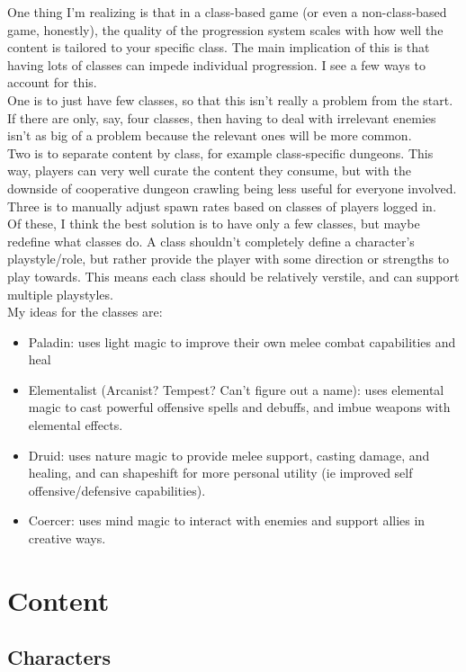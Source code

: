 \documentclass{article}
\begin{document}
One thing I'm realizing is that in a class-based game (or even a non-class-based game, honestly), the
quality of the progression system scales with how well the content is tailored to your specific class.
The main implication of this is that having lots of classes can impede individual progression.
I see a few ways to account for this.\\
One is to just have few classes, so that this isn't
really a problem from the start. If there are only, say, four classes, then having to deal with
irrelevant enemies isn't as big of a problem because the relevant ones will be more common.\\
Two is to separate content by class, for example class-specific dungeons. This way, players can
very well curate the content they consume, but with the downside of cooperative dungeon crawling
being less useful for everyone involved.\\
Three is to manually adjust spawn rates based on classes of players logged in.\\

Of these, I think the best solution is to have only a few classes, but maybe redefine what classes do.
A class shouldn't completely define a character's playstyle/role, but rather provide the player with some
direction or strengths to play towards. This means each class should be relatively verstile, and
can support multiple playstyles.\\
My ideas for the classes are:
\begin{itemize}
    \item Paladin: uses light magic to improve their own melee combat capabilities and heal
    \item Elementalist (Arcanist? Tempest? Can't figure out a name): uses elemental magic to cast powerful
        offensive spells and debuffs, and imbue weapons with elemental effects.
    \item Druid: uses nature magic to provide melee support, casting damage, and healing, and can
        shapeshift for more personal utility (ie improved self offensive/defensive capabilities).
    \item Coercer: uses mind magic to interact with enemies and support allies in creative ways.
\end{itemize}

\section{Content}
\subsection{Characters}
\end{document}
